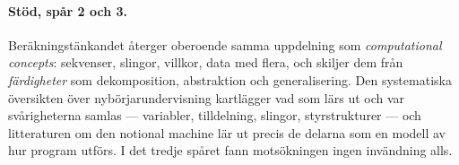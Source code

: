 \paragraph{Stöd, spår 2 och 3.}  Beräkningstänkandet återger oberoende
samma uppdelning som \emph{computational concepts}: sekvenser, slingor,
villkor, data med flera\autocite{brennan2012}, och skiljer dem från
\emph{färdigheter} som dekomposition, abstraktion och
generalisering\autocite{wing2006,shute2017}.  Den systematiska
översikten över nybörjarundervisning\autocite{luxtonreilly2018} kartlägger
vad som lärs ut och var svårigheterna samlas --- variabler, tilldelning,
slingor, styrstrukturer --- och litteraturen om den
\foreignlanguage{english}{notional machine} lär ut precis de delarna som
en modell av hur program utförs.  I det tredje spåret fann motsökningen
ingen invändning alls.

